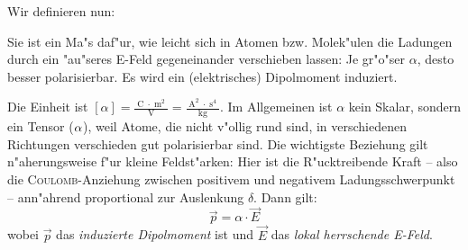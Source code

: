 Wir definieren nun:
\begin{Def}
    Sie ist ein
   Ma"s daf"ur, wie leicht sich in Atomen bzw. Molek"ulen die Ladungen
   durch ein "au"seres E-Feld gegeneinander verschieben lassen: Je
   gr"o"ser $\alpha$, desto besser polarisierbar. Es wird
   ein (elektrisches) Dipolmoment induziert.
\end{Def}
Die Einheit ist $[\alpha] = \frac{\operatorname{C} \cdot
  \operatorname{m}^2}{\operatorname{V}} = \frac{\operatorname{A}^2
  \cdot \operatorname{s}^4}{\operatorname{kg}}$. Im Allgemeinen ist
$\alpha$ kein Skalar, sondern ein Tensor (${\mathcal{\alpha}}$), weil Atome,
die nicht v"ollig rund sind, in verschiedenen Richtungen verschieden
gut polarisierbar sind. Die wichtigste Beziehung gilt n"aherungsweise
f"ur kleine Feldst"arken: Hier ist die R"ucktreibende Kraft -- also die
\textsc{Coulomb}-Anziehung zwischen positivem und negativem
Ladungsschwerpunkt -- ann"ahrend proportional zur Auslenkung
$\delta$. Dann gilt:
\begin{equation}
   \label{eqn_differenz-c30}
   \boxed{  \vec p = \alpha \cdot \vec E }
\end{equation}
wobei $\vec p$ das \emph{induzierte
  Dipolmoment} ist und $\vec E$ das \emph{lokal herrschende E-Feld}.


